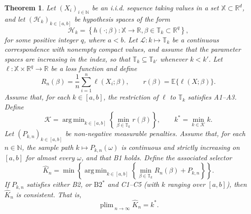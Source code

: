 \documentclass[12pt]{article}
\DeclareMathOperator*{\argmin}{arg\,min}
\DeclareMathOperator*{\plim}{plim\,}
\newcommand{\blue}[1]{\textcolor[rgb]{0.00,0.00,1.00}{#1}}
\newtheorem{theorem}{Theorem}
\theoremstyle{remark}
\theoremstyle{plain}
\begin{document}
\begin{theorem}\label{Thm: Infinite selection}
Let $(X_{i})_{i\in\mathbb{N}}$ be an i.i.d. sequence taking values in a set $\mathbb{X}\subset\mathbb{R}^{d}$, and let $(\mathcal{H}_{k})_{k\in\left[a,b\right]}$ be hypothesis spaces of the form
\[
\mathcal{H}_{k}=\left\{ h(\cdot;\beta):\mathbb{X}\to\mathbb{R}, \beta\in\mathbb{T}_{k}\subset\mathbb{R}^{q}\right\},
\]
for some positive integer $q$, where $a<b$. Let $\mathcal{L}:k\mapsto\mathbb{T}_{k}$ be a continuous correspondence with \blue{nonempty} compact values, and assume that the parameter spaces are increasing in the index, so that $\mathbb T_k\subseteq\mathbb T_{k'}$ whenever $k<k'$. Let $\ell:\mathbb{X}\times\mathbb{R}^{q}\to\mathbb{R}$ be a loss function and define
\[
R_{n}(\beta)=\frac{1}{n}\sum_{i=1}^{n}\ell(X_{i};\beta),\qquad r(\beta)=\mathbb{E}\{\ell(X;\beta)\}.
\]
Assume that, for each $k\in\left[a,b\right]$, the restriction of $\ell$ to $\mathbb{T}_{k}$ satisfies A1--A3. Define
\[
\mathcal{K}=\argmin_{k\in\left[a,b\right]}\left\{ \min_{\beta\in\mathbb{T}_{k}}r(\beta)\right\},\qquad k^{*}=\min_{k\in\mathcal{K}}k.
\]
Let $(P_{k,n})_{k\in\left[a,b\right]}$ be non-negative measurable penalties. Assume that, for each $n\in\mathbb{N}$, the sample path $k\mapsto P_{k,n}(\omega)$ is continuous and strictly increasing on $\left[a,b\right]$ for almost every $\omega$, and that B1 holds. Define the associated selector
\[
\hat{K}_{n}=\min\left\{\argmin_{k\in\left[a,b\right]}\left\{ \min_{\beta\in\mathbb{T}_{k}}R_{n}(\beta)+P_{k,n}\right\}\right\}.
\]
If $P_{k,n}$ satisfies either B2, or $\mathrm{B2}^{*}$ and C1--C5 (with $k$ ranging over $\left[a,b\right]$), then $\hat{K}_{n}$ is consistent. That is,
\begin{equation}
\plim_{n\to\infty}\hat{K}_{n}=k^{*}.\label{Eqs: convergence in probability}
\end{equation}
\end{theorem}
\end{document}

